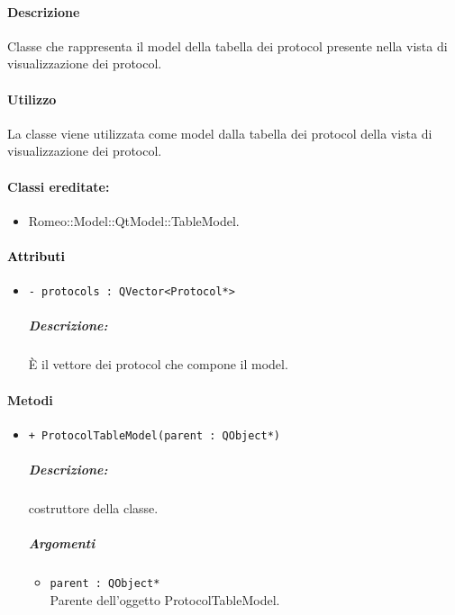 {\paragraph{Descrizione\\} 
Classe che rappresenta il model della tabella dei protocol\g{} presente nella vista di visualizzazione dei protocol\g{}.

\paragraph{Utilizzo\\}
La classe viene utilizzata come model dalla tabella dei protocol\g{} della vista di visualizzazione dei protocol\g{}.

\paragraph{Classi ereditate:}
\begin{itemize}
	\item Romeo::Model::QtModel::TableModel.
\end{itemize}

\paragraph{\textcolor{black}{Attributi\\}}
	\begin{itemize}
		\item \color{teal}\verb!- protocols : QVector<Protocol*>!
		\color{black}
		\subparagraph{Descrizione:} È il vettore dei protocol\g{} che compone il model.
	\end{itemize}
	
\paragraph{\color{black}Metodi\\}
\begin{itemize}
	\item \color{blue}\verb!+ ProtocolTableModel(parent : QObject*)!\\
		\color{black}
		\subparagraph{Descrizione:} costruttore della classe.\\
		\subparagraph{Argomenti}
			\begin{itemize}
				\item \color{RoyalPurple}\verb!parent : QObject*!\\
				\color{Black}Parente dell'oggetto ProtocolTableModel.
			\end{itemize}
			

\end{itemize}}
